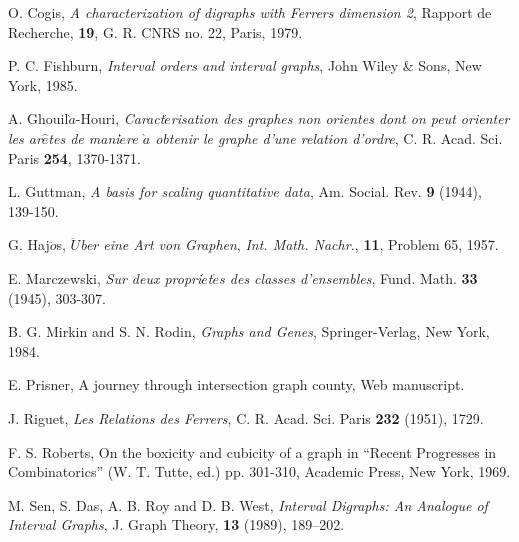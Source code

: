 \documentclass[11pt]{article}
\theoremstyle{definition}
\theoremstyle{remark}
\numberwithin{equation}{section}
\begin{document}
\vspace{2em}
\begin{thebibliography}{10}\label{bibliography}

O. Cogis, \emph{A characterization of digraphs with Ferrers dimension 2}, Rapport de Recherche, \textbf{19}, G. R. CNRS no. 22, Paris, 1979.

 P. C. Fishburn, \emph{Interval orders and interval graphs}, John Wiley \& Sons, New York, 1985.

A. Ghouil$\grave{a}$-Houri, \emph{Caract$\acute{e}$risation des graphes non orientes dont on peut orienter les ar$\hat{e}$tes de mani$\grave{e}$re $\grave{a}$ obtenir le graphe d'une relation d'ordre}, C. R. Acad. Sci. Paris \textbf{254}, 1370-1371.

L. Guttman, \emph{A basis for scaling quantitative data}, Am. Social. Rev. \textbf{9} (1944), 139-150.

G. Haj$\ddot{o}$s, \emph{$\ddot{U}$ber eine Art von Graphen}, \textit{Int. Math. Nachr.}, \textbf{11}, Problem 65, 1957.

E. Marczewski, \emph{Sur deux propri$\acute{e}$t$\acute{e}$s des classes d'ensembles}, Fund. Math. \textbf{33} (1945), 303-307.

B. G. Mirkin and S. N. Rodin, \emph{Graphs and Genes}, Springer-Verlag, New York, 1984.

 E. Prisner, A journey  through intersection graph county, Web
manuscript.

J. Riguet, \emph{Les Relations des Ferrers}, C. R. Acad. Sci. Paris \textbf{232} (1951), 1729.

F. S. Roberts, On the boxicity and cubicity of a graph in ``Recent Progresses in Combinatorics'' (W. T. Tutte, ed.) pp. 301-310, Academic Press, New York, 1969.

M. Sen, S. Das, A. B. Roy and D. B. West, \emph{Interval Digraphs: An Analogue of Interval Graphs}, J. Graph Theory, \textbf{13} (1989), 189--202.

\end{thebibliography}
\end{document}

